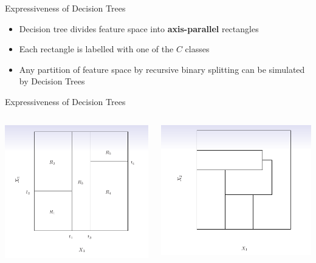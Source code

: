 \documentclass{beamer}
\begin{document}
\begin{frame}{Expressiveness of Decision Trees}
    \begin{itemize}
        \item Decision tree divides feature space into {\bf axis-parallel} rectangles
        \item Each rectangle is labelled with one of the $C$ classes
        \item Any partition of feature space by recursive binary splitting can be simulated by Decision Trees
    \end{itemize}
\end{frame}

\begin{frame}{Expressiveness of Decision Trees}
    \begin{columns}
            \centering
            \includegraphics[scale=0.36]{dTreeExpressiveness1.png}
            
            \centering
            \includegraphics[scale=0.40]{dTreeExpressiveness3.png}
    \end{columns}


\end{frame}
\end{document}
